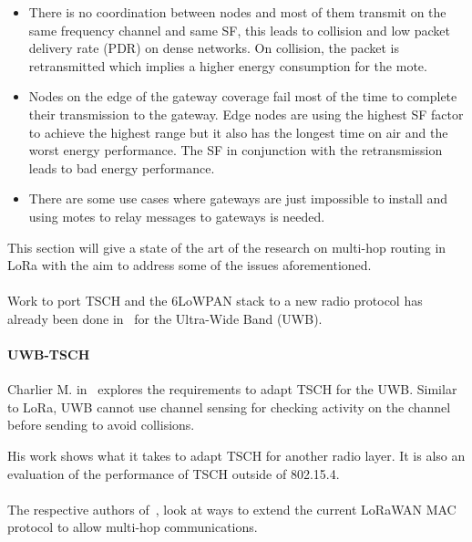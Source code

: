 \begin{itemize}
  \item There is no coordination between nodes and most of them transmit on the
    same frequency channel and same SF, this leads to collision and low packet delivery
    rate (PDR) on dense networks. On collision, the packet is retransmitted
    which implies a higher energy consumption for the mote.
  \item Nodes on the edge of the gateway coverage fail most of the time to
    complete their transmission to the gateway. Edge nodes are using the
    highest SF factor to achieve the highest range but it also has
    the longest time on air and the worst energy performance.
    The SF in conjunction with the retransmission leads to bad energy performance.
  \item There are some use cases where gateways are just impossible to install
    and using motes to relay messages to gateways is needed.
\end{itemize}

This section will give a state of the art of the research on
multi-hop routing in LoRa with the aim to address some of the issues
aforementioned.

\paragraph{}

Work to port TSCH and the 6LoWPAN stack to a new radio protocol has already
been done in~\cite{uwbtsch} for the Ultra-Wide Band (UWB).

\paragraph{UWB-TSCH}

Charlier M. in~\cite{uwbtsch} explores the requirements to adapt TSCH for the UWB.
Similar to LoRa, UWB cannot use channel sensing for checking activity on the 
channel before sending to avoid collisions.

His work shows what it takes to adapt TSCH for another radio layer.
It is also an evaluation of the performance of TSCH outside of 802.15.4.

\paragraph{}

The respective authors of~\cite{DIAS2018424, 8856256}, look at ways to extend
the current LoRaWAN MAC protocol to allow multi-hop communications.

